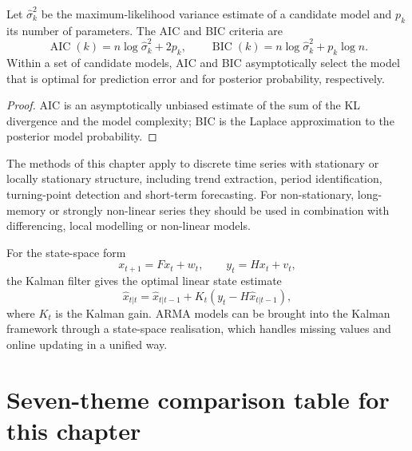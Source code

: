 \begin{theorem}\label{thm:ts_model_selection}
Let $\hat\sigma^2_k$ be the maximum-likelihood variance estimate of a candidate model and $p_k$ its number of parameters. The AIC and BIC criteria are
\[
\operatorname{AIC}(k)=n\log\hat\sigma_k^2+2p_k,\qquad
\operatorname{BIC}(k)=n\log\hat\sigma_k^2+p_k\log n.
\]
Within a set of candidate models, AIC and BIC asymptotically select the model that is optimal for prediction error and for posterior probability, respectively.
\end{theorem}

\begin{proof}
AIC is an asymptotically unbiased estimate of the sum of the KL divergence and the model complexity; BIC is the Laplace approximation to the posterior model probability.
\end{proof}

\begin{remark}\label{rem:ts_scope}
The methods of this chapter apply to discrete time series with stationary or locally stationary structure, including trend extraction, period identification, turning-point detection and short-term forecasting. For non-stationary, long-memory or strongly non-linear series they should be used in combination with differencing, local modelling or non-linear models.
\end{remark}

\begin{remark}\label{rem:ts_kalman_interface}
For the state-space form
\[
x_{t+1}=Fx_t+w_t,\qquad y_t=Hx_t+v_t,
\]
the Kalman filter gives the optimal linear state estimate
\[
\hat x_{t|t}=\hat x_{t|t-1}+K_t(y_t-H\hat x_{t|t-1}),
\]
where $K_t$ is the Kalman gain. ARMA models can be brought into the Kalman framework through a state-space realisation, which handles missing values and online updating in a unified way.
\end{remark}

\section*{Seven-theme comparison table for this chapter}

